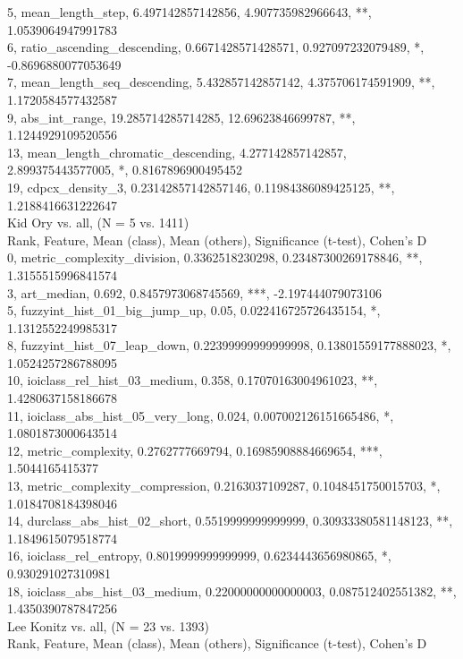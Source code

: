 5, mean_length_step, 6.497142857142856, 4.907735982966643, **, 1.0539064947991783\\
6, ratio_ascending_descending, 0.6671428571428571, 0.927097232079489, *, -0.8696880077053649\\
7, mean_length_seq_descending, 5.432857142857142, 4.375706174591909, **, 1.1720584577432587\\
9, abs_int_range, 19.285714285714285, 12.69623846699787, **, 1.1244929109520556\\
13, mean_length_chromatic_descending, 4.277142857142857, 2.899375443577005, *, 0.8167896900495452\\
19, cdpcx_density_3, 0.23142857142857146, 0.11984386089425125, **, 1.2188416631222647\\
Kid Ory vs. all, (N = 5 vs. 1411)\\
Rank, Feature, Mean (class), Mean (others), Significance (t-test), Cohen's D\\
0, metric_complexity_division, 0.3362518230298, 0.23487300269178846, **, 1.3155515996841574\\
3, art_median, 0.692, 0.8457973068745569, ***, -2.197444079073106\\
5, fuzzyint_hist_01_big_jump_up, 0.05, 0.022416725726435154, *, 1.1312552249985317\\
8, fuzzyint_hist_07_leap_down, 0.22399999999999998, 0.13801559177888023, *, 1.0524257286788095\\
10, ioiclass_rel_hist_03_medium, 0.358, 0.17070163004961023, **, 1.4280637158186678\\
11, ioiclass_abs_hist_05_very_long, 0.024, 0.007002126151665486, *, 1.0801873000643514\\
12, metric_complexity, 0.2762777669794, 0.16985908884669654, ***, 1.5044165415377\\
13, metric_complexity_compression, 0.2163037109287, 0.1048451750015703, *, 1.0184708184398046\\
14, durclass_abs_hist_02_short, 0.5519999999999999, 0.30933380581148123, **, 1.1849615079518774\\
16, ioiclass_rel_entropy, 0.8019999999999999, 0.6234443656980865, *, 0.930291027310981\\
18, ioiclass_abs_hist_03_medium, 0.22000000000000003, 0.087512402551382, **, 1.4350390787847256\\
Lee Konitz vs. all, (N = 23 vs. 1393)\\
Rank, Feature, Mean (class), Mean (others), Significance (t-test), Cohen's D\\
